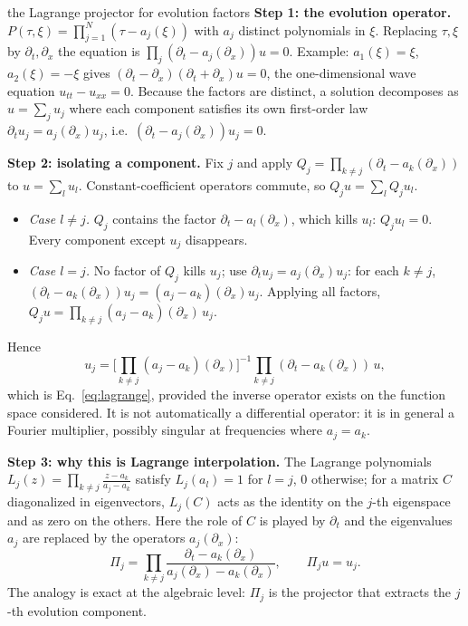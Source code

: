 \begin{explained}{the Lagrange projector for evolution factors}
\textbf{Step 1: the evolution operator.} $P(\tau,\xi)=\prod_{j=1}^N(\tau-a_j(\xi))$ with $a_j$ distinct polynomials in $\xi$. Replacing $\tau,\xi$ by $\partial_t,\partial_x$ the equation is $\prod_j(\partial_t-a_j(\partial_x))u=0$. Example: $a_1(\xi)=\xi$, $a_2(\xi)=-\xi$ gives $(\partial_t-\partial_x)(\partial_t+\partial_x)u=0$, the one-dimensional wave equation $u_{tt}-u_{xx}=0$. Because the factors are distinct, a solution decomposes as $u=\sum_ju_j$ where each component satisfies its own first-order law $\partial_tu_j=a_j(\partial_x)u_j$, i.e.\ $(\partial_t-a_j(\partial_x))u_j=0$.

\medskip\textbf{Step 2: isolating a component.} Fix $j$ and apply $Q_j=\prod_{k\ne j}(\partial_t-a_k(\partial_x))$ to $u=\sum_lu_l$. Constant-coefficient operators commute, so $Q_ju=\sum_lQ_ju_l$.
\begin{itemize}[nosep]
\item \emph{Case $l\ne j$.} $Q_j$ contains the factor $\partial_t-a_l(\partial_x)$, which kills $u_l$: $Q_ju_l=0$. Every component except $u_j$ disappears.
\item \emph{Case $l=j$.} No factor of $Q_j$ kills $u_j$; use $\partial_tu_j=a_j(\partial_x)u_j$: for each $k\ne j$, $(\partial_t-a_k(\partial_x))u_j=(a_j-a_k)(\partial_x)u_j$. Applying all factors, $Q_ju=\prod_{k\ne j}(a_j-a_k)(\partial_x)\,u_j$.
\end{itemize}
Hence
\[
u_j=\Big[\prod_{k\ne j}(a_j-a_k)(\partial_x)\Big]^{-1}\prod_{k\ne j}(\partial_t-a_k(\partial_x))\,u,
\]
which is Eq.~\eqref{eq:lagrange}, provided the inverse operator exists on the function space considered. It is not automatically a differential operator: it is in general a Fourier multiplier, possibly singular at frequencies where $a_j=a_k$.

\medskip\textbf{Step 3: why this is Lagrange interpolation.} The Lagrange polynomials $L_j(z)=\prod_{k\ne j}\frac{z-a_k}{a_j-a_k}$ satisfy $L_j(a_l)=1$ for $l=j$, $0$ otherwise; for a matrix $C$ diagonalized in eigenvectors, $L_j(C)$ acts as the identity on the $j$-th eigenspace and as zero on the others. Here the role of $C$ is played by $\partial_t$ and the eigenvalues $a_j$ are replaced by the operators $a_j(\partial_x)$:
\[
\Pi_j=\prod_{k\ne j}\frac{\partial_t-a_k(\partial_x)}{a_j(\partial_x)-a_k(\partial_x)},\qquad \Pi_ju=u_j .
\]
The analogy is exact at the algebraic level: $\Pi_j$ is the projector that extracts the $j$-th evolution component.


\end{explained}
